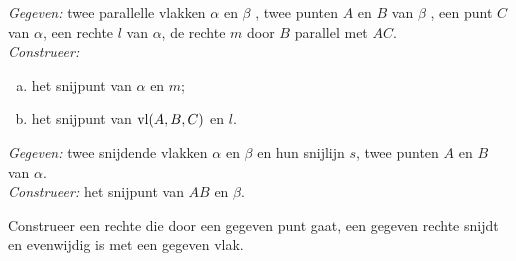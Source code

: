 \documentclass[12pt,twoside]{article}
\begin{document}
\begin{oefening}
{\em Gegeven:} twee parallelle vlakken $\alpha$ en $\beta$ , twee punten $A$ en $B$ van $\beta$ , een punt $C$
van $\alpha$, een rechte $l$ van $\alpha$, de rechte $m$ door $B$ parallel met $AC$.\\
{\em Construeer:}
\begin{enumerate}[(a)]
  \item het snijpunt van $\alpha$ en $m$;
  \item het snijpunt van $\vl(A, B, C)$ en $l$.
\end{enumerate}
\end{oefening}

\begin{oefening}
{\em Gegeven:} twee snijdende vlakken $\alpha$ en $\beta$ en hun snijlijn $s$, twee punten $A$ en $B$ van $\alpha$.\\
{\em Construeer:} het snijpunt van $AB$ en $\beta$.
\end{oefening}

\begin{oefening}
Construeer een rechte die door een gegeven punt gaat, een gegeven rechte snijdt en
evenwijdig is met een gegeven vlak.
\end{oefening}
\end{document}
